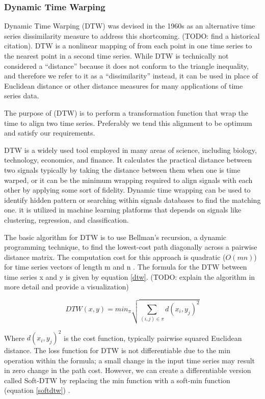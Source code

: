 \documentclass[12pt, letterpaper]{article}
\begin{document}
\subsubsection{Dynamic Time Warping}

Dynamic Time Warping (DTW) was devised in the 1960s as an alternative time
series dissimilarity measure to address this shortcoming. (TODO: find a
historical citation). DTW is a nonlinear mapping of from each point in one time
series to the nearest point in a second time series. While DTW is technically
not considered a ``distance'' because it does not conform to the triangle
inequality, and therefore we refer to it as a ``dissimilarity'' instead, it can
be used in place of Euclidean distance or other distance measures for many
applications of time series data.

The purpose of (DTW) is to perform a transformation
function that wrap the time to align two time series. Preferably we tend this
alignment to be optimum and satisfy our
requirements.\cite{deriso_general_nodate}

DTW is a widely used tool employed in many areas of science, including biology,
technology, economics, and finance. It calculates the practical distance between
two signals typically by taking the distance between them when one is time
warped, or it can be the minimum wrapping required to align signals with each
other by applying some sort of fidelity.  Dynamic time wrapping can be used to
identify hidden pattern or searching within signals databases to find the
matching one.\cite{keogh_derivative_2001} it is utilized in machine learning
platforms that depends on signals like clustering, regression, and
classification.

The basic algorithm for DTW is to use Bellman’s recursion, a dynamic programming
technique, to find the lowest-cost path diagonally across a pairwise distance
matrix. The computation cost for this approach is quadratic ($O(mn)$) for time
series vectors of length m and n \cite{cuturi_soft-dtw_2018}. The formula for
the DTW between time series x and y is given by equation \ref{dtw}.
(TODO: explain the algorithm in more detail and provide a visualization)

\begin{equation} \label{dtw}
DTW(x,y) = min_{\pi}\sqrt{\sum_{(i,j)\in\pi}d(x_{i},y_{j})^2}
\end{equation}

Where $d(x_i,y_j)^2$ is the cost function, typically pairwise squared Euclidean
distance. The loss function for DTW is not differentiable due to the min
operation within the formula; a small change in the input time series may result
in zero change in the path cost. However, we can create a differentiable version
called Soft-DTW by replacing the min function with a soft-min function
(equation \ref{softdtw}) \cite{cuturi_soft-dtw_2018}.
\end{document}
